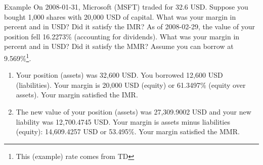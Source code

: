 \documentclass{beamer}
\begin{document}

\begin{frame}{Example}
	\small
	On 2008-01-31, Microsoft (MSFT) traded for 32.6 USD. Suppose you bought 1,000 shares with 20,000 USD of capital. What was your margin in percent and in USD? Did it satisfy the IMR? As of 2008-02-29, the value of your position fell 16.2273\% (accounting for dividends). What was your margin in percent and in USD? Did it satisfy the MMR? Assume you can borrow at 9.569\%\footnote{This (example) rate comes from TD}.  
	\pause
		\begin{enumerate}
			\item{\color{blue}Your position (assets) was 32,600 USD. You borrowed 12,600 USD (liabilities). Your margin is 20,000 USD (equity) or 61.3497\% (equity over assets). Your margin satisfied the IMR.}
			\item{\color{blue}The new value of your position (assets) was 27,309.9002 USD and your new liability was 12,700.4745 USD. Your margin is assets minus liabilities (equity): 14,609.4257 USD or 53.495\%. Your margin satisfied the MMR.}
		\end{enumerate}
\end{frame}
\end{document}
